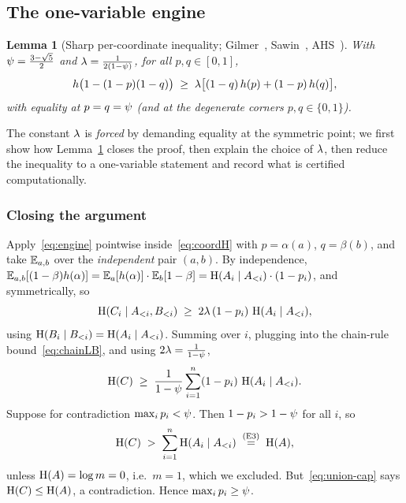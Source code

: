 \documentclass[11pt]{amsart}
\newtheorem{lemma}[theorem]{Lemma}
\theoremstyle{definition}
\theoremstyle{remark}
\begin{document}
\subsection{The one-variable engine}\label{ssec:lemma2}

\begin{lemma}[Sharp per-coordinate inequality; Gilmer~\cite{gilmer2022},
Sawin~\cite{sawin2022}, AHS~\cite{ahs2023}]\label{lem:engine}
With $\psi=\tfrac{3-\sqrt{5}}{2}$ and $\lambda=\tfrac1{2(1-\psi)}$, for all $p,q\in[0,1]$,
\begin{equation}\label{eq:engine}
   h\bigl(1-(1-p)(1-q)\bigr)\;\ge\;\lambda\bigl[(1-q)\,h(p)+(1-p)\,h(q)\bigr],
\end{equation}
with equality at $p=q=\psi$ (and at the degenerate corners $p,q\in\{0,1\}$).
\end{lemma}

The constant $\lambda$ is \emph{forced} by demanding equality at the symmetric
point; we first show how Lemma~\ref{lem:engine} closes the proof, then explain
the choice of $\lambda$, then reduce the inequality to a one-variable statement and
record what is certified computationally.

\subsubsection*{Closing the argument}
Apply~\eqref{eq:engine} pointwise inside~\eqref{eq:coordH} with $p=\alpha(a)$,
$q=\beta(b)$, and take $\mathbb{E}_{a,b}$ over the \emph{independent} pair $(a,b)$. By
independence, $\mathbb{E}_{a,b}[(1-\beta)h(\alpha)]=\mathbb{E}_a[h(\alpha)]\cdot\mathbb{E}_b[1-\beta]
=\operatorname{H}(A_i\mid A_{<i})\cdot(1-p_i)$, and symmetrically, so
\begin{equation}\label{eq:percoord}
   \operatorname{H}(C_i\mid A_{<i},B_{<i})\;\ge\;2\lambda\,(1-p_i)\,\operatorname{H}(A_i\mid A_{<i}),
\end{equation}
using $\operatorname{H}(B_i\mid B_{<i})=\operatorname{H}(A_i\mid A_{<i})$. Summing over $i$, plugging into
the chain-rule bound~\eqref{eq:chainLB}, and using $2\lambda=\tfrac1{1-\psi}$,
\begin{equation}\label{eq:assembled}
   \operatorname{H}(C)\;\ge\;\frac{1}{1-\psi}\sum_{i=1}^n(1-p_i)\,\operatorname{H}(A_i\mid A_{<i}).
\end{equation}
Suppose for contradiction $\max_i p_i<\psi$. Then $1-p_i>1-\psi$ for all $i$, so
\begin{equation}\label{eq:contra}
   \operatorname{H}(C)\;>\;\sum_{i=1}^n\operatorname{H}(A_i\mid A_{<i})\;\overset{\text{(E3)}}{=}\;\operatorname{H}(A),
\end{equation}
unless $\operatorname{H}(A)=\log m=0$, i.e.\ $m=1$, which we excluded. But~\eqref{eq:union-cap}
says $\operatorname{H}(C)\le\operatorname{H}(A)$, a contradiction. Hence $\max_i p_i\ge\psi$.
\end{document}
